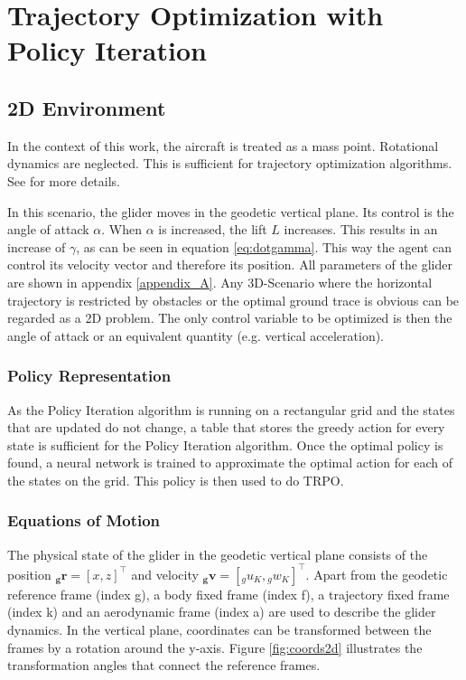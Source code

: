 \chapter{Trajectory Optimization with Policy Iteration}
\label{chapter5}
\section{2D Environment}

In the context of this work, the aircraft is treated as a mass point. Rotational dynamics are neglected. This is sufficient for trajectory optimization algorithms. See \cite{Fichter2009} for more details. 


In this scenario, the glider moves in the geodetic vertical plane. Its control is the angle of attack $\alpha$. When $\alpha$ is increased, the lift $L$ increases. This results in an increase of $\gamma$, as can be seen in equation \ref{eq:dotgamma}. This way the agent can control its velocity vector and therefore its position. All parameters of the glider are shown in appendix \ref{appendix_A}. Any 3D-Scenario where the horizontal trajectory is restricted by obstacles or the optimal ground trace is obvious can be regarded as a 2D problem. The only control variable to be optimized is then the angle of attack or an equivalent quantity (e.g. vertical acceleration).

\subsection{Policy Representation}

As the Policy Iteration algorithm is running on a rectangular grid and the states that are updated do not change, a table that stores the greedy action for every state is sufficient for the Policy Iteration algorithm. Once the optimal policy is found, a neural network is trained to approximate the optimal action for each of the states on the grid. This policy is then used to do TRPO.

\subsection{Equations of Motion}

The physical state of the glider in the geodetic vertical plane consists of the position $\boldsymbol{{}_g r}=[x,z]^\top$ and velocity $\boldsymbol{{}_g v}=[{}_g u_K,{}_g w_K]^\top$. Apart from the geodetic reference frame (index g), a body fixed frame (index f), a trajectory fixed frame (index k) and an aerodynamic frame (index a) are used to describe the glider dynamics. In the vertical plane, coordinates can be transformed between the frames by a rotation around the y-axis. Figure \ref{fig:coords2d} illustrates the transformation angles that connect the reference frames. 

